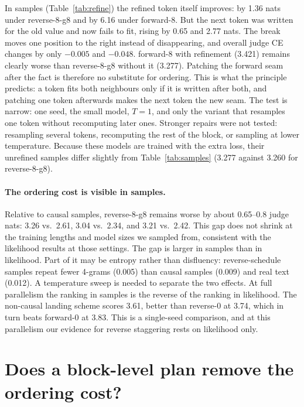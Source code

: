 \documentclass[11pt]{article}
\theoremstyle{definition}
\theoremstyle{remark}
\newcommand{\sch}[1]{\textsf{#1}}
\begin{document}
In samples (Table~\ref{tab:refine}) the refined token itself improves: by 1.36 nats under \sch{reverse-8-g8} and by 6.16 under \sch{forward-8}.
But the next token was written for the old value and now fails to fit, rising by 0.65 and 2.77 nats.
The break moves one position to the right instead of disappearing, and overall judge CE changes by only $-0.005$ and $-0.048$.
\sch{forward-8} with refinement (3.421) remains clearly worse than \sch{reverse-8-g8} without it (3.277).
Patching the forward seam after the fact is therefore no substitute for ordering.
This is what the principle predicts: a token fits both neighbours only if it is written after both, and patching one token afterwards makes the next token the new seam.
The test is narrow: one seed, the small model, $T=1$, and only the variant that resamples one token without recomputing later ones.
Stronger repairs were not tested: resampling several tokens, recomputing the rest of the block, or sampling at lower temperature.
Because these models are trained with the extra loss, their unrefined samples differ slightly from Table~\ref{tab:samples} (3.277 against 3.260 for \sch{reverse-8-g8}).

\paragraph{The ordering cost is visible in samples.}
Relative to causal samples, \sch{reverse-8-g8} remains worse by about 0.65--0.8 judge nats: 3.26 vs.\ 2.61, 3.04 vs.\ 2.34, and 3.21 vs.\ 2.42.
This gap does not shrink at the training lengths and model sizes we sampled from, consistent with the likelihood results at those settings.
The gap is larger in samples than in likelihood.
Part of it may be entropy rather than disfluency: reverse-schedule samples repeat fewer 4-grams (0.005) than causal samples (0.009) and real text (0.012).
A temperature sweep is needed to separate the two effects.
At full parallelism the ranking in samples is the reverse of the ranking in likelihood.
The non-causal \sch{landing} scheme scores 3.61, better than \sch{reverse-0} at 3.74, which in turn beats \sch{forward-0} at 3.83.
This is a single-seed comparison, and at this parallelism our evidence for reverse staggering rests on likelihood only.

\section{Does a block-level plan remove the ordering cost?}
\label{sec:latent}
\end{document}
